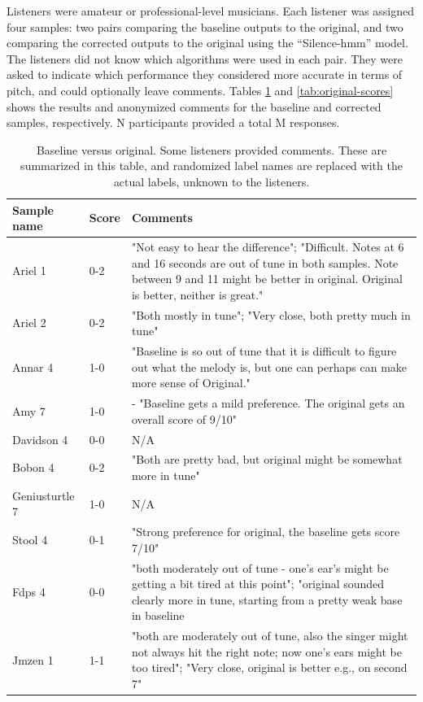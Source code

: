Listeners were amateur or professional-level musicians. Each listener was assigned four samples: two pairs comparing the baseline outputs to the original, and two comparing the corrected outputs to the original using the ``Silence-\gls{hmm}'' model. The listeners did not know which algorithms were used in each pair. They were asked to indicate which performance they considered more accurate in terms of pitch, and could optionally leave comments. Tables \ref{tab:baseline-scores} and \ref{tab:original-scores} shows the results and anonymized comments for the baseline and corrected samples, respectively. N participants provided a total M responses. 


\begin{table}
  \begin{center}
    \label{tab:baseline-scores}
    \begin{tabularx}{\columnwidth}{|l|l|X|}
    \hline
\textbf{Sample name} & \textbf{Score} & \textbf{Comments} \\
\hline\hline
Ariel 1 & 0-2 & "Not easy to hear the difference"; "Difficult. Notes at 6 and 16 seconds are out of tune in both samples. Note between 9 and 11 might be better in original. Original is better, neither is great."\\
\hline
Ariel 2 & 0-2 & "Both mostly in tune"; "Very close, both pretty much in tune"\\ 
\hline
Annar 4 & 1-0 & "Baseline is so out of tune that it is difficult to figure out what the melody is, but one can perhaps can make more sense of Original."\\ 
\hline
Amy 7 & 1-0 & - "Baseline gets a mild preference. The original gets an overall score of 9/10"\\
\hline
Davidson 4 & 0-0 & N/A\\ 
\hline
Bobon 4 & 0-2 & "Both are pretty bad, but original might be somewhat more in tune" \\ 
\hline
Geniusturtle 7 & 1-0 & N/A\\ 
\hline
Stool 4 & 0-1 & "Strong preference for original, the baseline gets score 7/10"\\ 
\hline
Fdps 4 & 0-0 & "both moderately out of tune - one's ear's might be getting a bit tired at this point"; "original sounded clearly more in tune, starting from a pretty weak base in baseline\\ 
\hline
Jmzen 1 & 1-1 & "both are moderately out of tune, also the singer might not always hit the right note; now one's ears might be too tired"; "Very close, original is better e.g., on second 7" \\ 
\hline
    \end{tabularx}
    \caption{Baseline versus original. Some listeners provided comments. These are summarized in this table, and randomized label names are replaced with the actual labels, unknown to the listeners.}
  \end{center}
\end{table}

